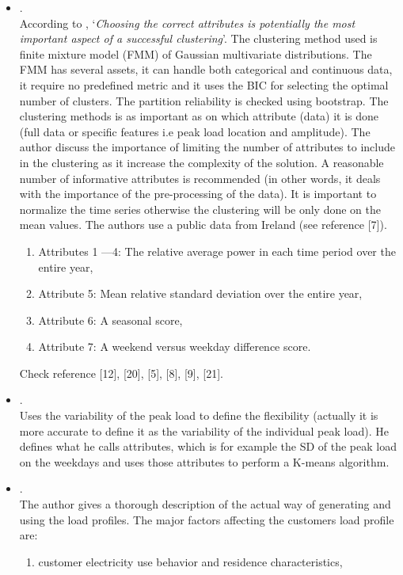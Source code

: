 \begin{itemize}
	\item {}.\\
	 According to \citeauthor{Haben2015}, `\emph{Choosing the correct attributes is potentially the most important aspect of a successful clustering}'. The clustering method used is finite mixture model (FMM) of Gaussian multivariate distributions. The FMM has several assets, it can handle both categorical and continuous data, it require no predefined metric and it uses the BIC for selecting the optimal number of clusters.  The partition reliability is checked using bootstrap. The clustering methods is as important as on which attribute (data) it is done (full data or specific features i.e peak load location and amplitude). The author discuss the importance of limiting the number of attributes to include in the clustering as it increase the complexity of the solution. A reasonable number of informative attributes is recommended (in other words, it deals with the importance of the pre-processing of the data). It is important to normalize the time series otherwise the clustering will be only done on the mean values. The authors use a public data from Ireland (see reference [7]). 
	 \begin{enumerate}
	 	\item Attributes 1 ---4: The relative average power in each time period over the entire year, 
	 	\item Attribute 5: Mean relative standard deviation over the entire year,
	 	\item Attribute 6: A seasonal score,
	 	\item Attribute 7: A weekend versus weekday difference score.
	 \end{enumerate}
	 Check reference [12], [20], [5], [8], [9], [21]. 
	\item  {}.\\
	  Uses the variability of the peak load to define the flexibility (actually it is more accurate to define it as the variability of the individual peak load). He defines what he calls attributes, which is for example the SD of the peak load on the weekdays and uses those attributes to perform a K-means algorithm.
	\item {}.\\
	 The author gives a thorough description of the actual way of generating and using the load profiles.
	 The major factors affecting the customers load profile are:
	 \begin{enumerate}
		\item customer electricity use behavior and residence characteristics,

\end{enumerate}
\end{itemize}
